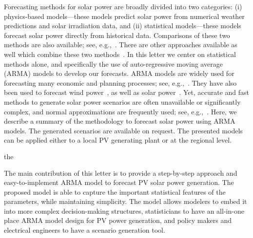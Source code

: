 \documentclass[letter]{IEEEtran}
\begin{document}
Forecasting methods for solar power are broadly divided 
into two categories: (i) physics-based models---these models predict solar 
power 
from numerical weather predictions and solar irradiation data, and (ii) 
statistical models---these 
models forecast 
solar power directly from historical data. Comparisons of these two 
methods are also available; see, 
e.g.,~\cite{huang2010comparative,inman2013solar}. There are other 
approaches available as well which combine these two 
methods~\cite{chen2011online}. 
In this letter we center on  statistical  methods alone, and specifically the 
use of auto-regressive moving average (ARMA) 
models to develop our forecasts. ARMA models are widely used for forecasting 
many economic and planning processes; see, e.g.,~\cite{box2008time}. They 
 have also been used to forecast wind power~\cite{brown1984time, 
duran2007short}, as well as solar 
power~\cite{mora1998multiplicative,huang2012solar}.  Yet, accurate and 
fast methods to generate solar power scenarios are often unavailable or 
significantly complex, and normal approximations are frequently used; see, 
e.g.,~\cite{su2014stochastic}. 
Here, 
we describe a summary of the methodology to forecast solar power using 
ARMA models. The generated scenarios are 
available on request.
The presented models can 
be applied either to a local PV generating plant or  at the regional 
level.

the 

The main contribution of this letter is to provide a step-by-step approach and 
easy-to-implement ARMA model to forecast PV solar power generation. The 
proposed model is able to capture the important statistical features of the 
parameters, while maintaining simplicity. The model allows modelers to embed
it into more complex decision-making structures, statisticians to have an 
all-in-one place ARMA model design for PV power generation, and policy 
makers and electrical engineers to have a scenario generation tool. 

% 
\end{document}
